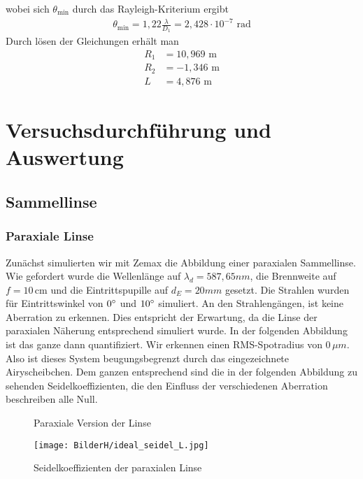 \documentclass[twoside,colorback,accentcolor=tud4c,11pt]{tudreport}
\begin{document}
wobei sich $ \theta_{\text{min}} $ durch das Rayleigh-Kriterium ergibt
\begin{align}
\theta_{\text{min}}=1,22\frac{\lambda}{D_1}=2,428\cdot 10^{-7}\text{ rad}
\end{align}
Durch lösen der Gleichungen erhält man
\begin{align}
R_1&=10,969\text{ m}\\
R_2&=-1,346\text{ m}\\
L&=4,876\text{ m}
\end{align}
\chapter{Versuchsdurchführung und Auswertung}
	\section{Sammellinse}
		\subsection{Paraxiale Linse}
		
		Zunächst simulierten wir mit Zemax die Abbildung einer paraxialen Sammellinse. Wie gefordert wurde die Wellenlänge auf $\lambda_d = 587,65 nm$, die Brennweite auf $f = 10 \, \text{cm}$ und die Eintrittspupille auf $d_E = 20 mm$ gesetzt. Die Strahlen wurden für Eintrittswinkel von $0\degree$ und $10\degree$ simuliert. An den Strahlengängen, ist keine Aberration zu erkennen. Dies entspricht der Erwartung, da die Linse der paraxialen Näherung entsprechend simuliert wurde. In der folgenden Abbildung ist das ganze dann quantifiziert. Wir erkennen einen RMS-Spotradius von $0 \, \mu m$. Also ist dieses System beugungsbegrenzt durch das eingezeichnete Airyscheibchen. Dem ganzen entsprechend sind die in der folgenden Abbildung zu sehenden Seidelkoeffizienten, die den Einfluss der verschiedenen Aberration beschreiben alle Null. 
		
	\begin{figure}[H]
\centering
  \quad
  \quad   
  \caption{Paraxiale Version der Linse}
\end{figure}		
		
\begin{figure}[H]
\centering
   	\begin{minipage}[b]{\textwidth}
 \centering  	\texttt{[image: BilderH/ideal\_seidel\_L.jpg]}
   	\caption{Seidelkoeffizienten der paraxialen Linse}
  	\end{minipage}
\end{figure}		
		
\end{document}

